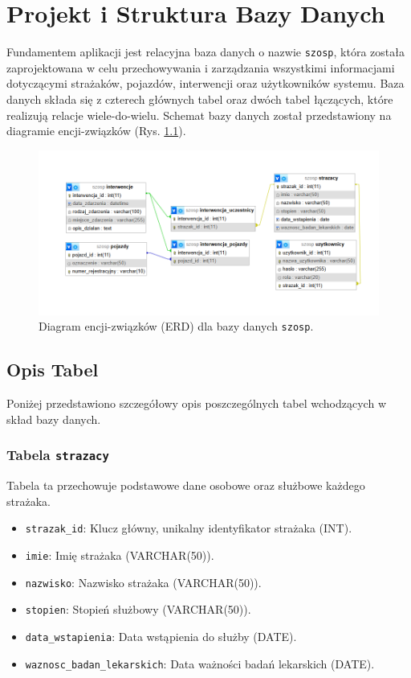 \chapter{Projekt i Struktura Bazy Danych}
\label{chap:baza_danych}

Fundamentem aplikacji jest relacyjna baza danych o nazwie \texttt{szosp}, która została zaprojektowana w celu przechowywania i zarządzania wszystkimi informacjami dotyczącymi strażaków, pojazdów, interwencji oraz użytkowników systemu. Baza danych składa się z czterech głównych tabel oraz dwóch tabel łączących, które realizują relacje wiele-do-wielu. Schemat bazy danych został przedstawiony na diagramie encji-związków (Rys. \ref{fig:erd}).

\begin{figure}[H]
	\centering
	\includegraphics[width=\textwidth]{figures/BazaDanych.png}
	\caption{Diagram encji-związków (ERD) dla bazy danych \texttt{szosp}.}
	\label{fig:erd}
\end{figure}

\section{Opis Tabel}
\label{sec:opis_tabel}

Poniżej przedstawiono szczegółowy opis poszczególnych tabel wchodzących w skład bazy danych.

\subsection{Tabela \texttt{strazacy}}
Tabela ta przechowuje podstawowe dane osobowe oraz służbowe każdego strażaka.
\begin{itemize}
    \item \texttt{strazak\_id}: Klucz główny, unikalny identyfikator strażaka (INT).
    \item \texttt{imie}: Imię strażaka (VARCHAR(50)).
    \item \texttt{nazwisko}: Nazwisko strażaka (VARCHAR(50)).
    \item \texttt{stopien}: Stopień służbowy (VARCHAR(50)).
    \item \texttt{data\_wstapienia}: Data wstąpienia do służby (DATE).
    \item \texttt{waznosc\_badan\_lekarskich}: Data ważności badań lekarskich (DATE).
\end{itemize}

